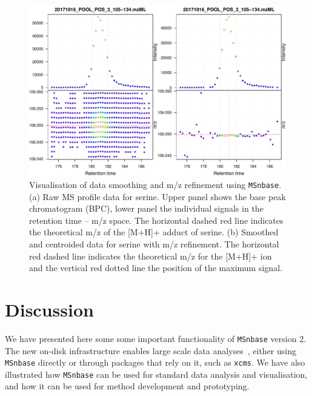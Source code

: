 \documentclass[journal=jacsat,manuscript=article]{achemso}\usepackage[]{graphicx}\usepackage[]{color}
\begin{document}
\begin{figure}
  \centering
  \includegraphics[width=\linewidth]{./figure/centroiding.pdf}
  \caption{Visualisation of data smoothing and m/z refinement using
    \texttt{MSnbase}. (a) Raw MS profile data for serine. Upper panel
    shows the base peak chromatogram (BPC), lower panel the individual
    signals in the retention time -- m/z space. The horizontal dashed
    red line indicates the theoretical m/z of the [M+H]+ adduct of
    serine. (b) Smoothed and centroided data for serine with m/z
    refinement. The horizontal red dashed line indicates the
    theoretical m/z for the [M+H]+ ion and the vertical red dotted
    line the position of the maximum signal. }
  \label{fig:cent}
\end{figure}


\section{Discussion}

We have presented here some some important functionality of
\texttt{MSnbase} version 2. The new on-disk infrastructure enables
large scale data analyses~\cite{Nothias:2020}, either using
\texttt{MSnbase} directly or through packages that rely on it, such as
\texttt{xcms}. We have also illustrated how \texttt{MSnbase} can be
used for standard data analysis and visualisation, and how it can be
used for method development and prototyping.
\end{document}
